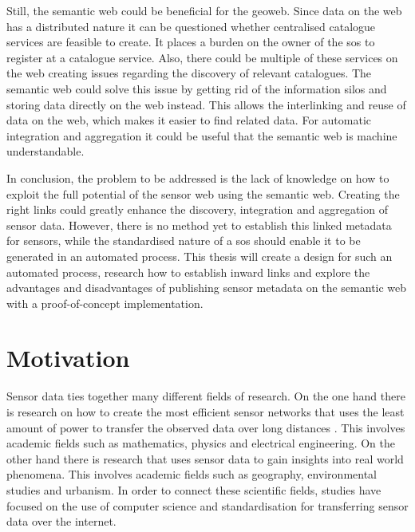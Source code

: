 Still, the semantic web could be beneficial for the geoweb. Since data on the web has a distributed nature it can be questioned whether centralised catalogue services are feasible to create. It places a burden on the owner of the \ac{sos} to register at a catalogue service. Also, there could be multiple of these services on the web creating issues regarding the discovery of relevant catalogues. The semantic web could solve this issue by getting rid of the information silos and storing data directly on the web instead. This allows the interlinking and reuse of data on the web, which makes it easier to find related data. For automatic integration and aggregation it could be useful that the semantic web is machine understandable. 

In conclusion, the problem to be addressed is the lack of knowledge on how to exploit the full potential of the sensor web using the semantic web. Creating the right links could greatly enhance the discovery, integration and aggregation of sensor data. However, there is no method yet to establish this linked metadata for sensors, while the standardised nature of a \ac{sos} should enable it to be generated in an automated process. This thesis will create a design for such an automated process, research how to establish inward links and explore the advantages and disadvantages of publishing sensor metadata on the semantic web with a proof-of-concept implementation. 

\section{Motivation}
Sensor data ties together many different fields of research. On the one hand there is research on how to create the most efficient sensor networks that uses the least amount of power to transfer the observed data over long distances \citep{SW:Korteweg,SW:Xiang}. This involves academic fields such as mathematics, physics and electrical engineering. On the other hand there is research that uses sensor data to gain insights into real world phenomena. This involves academic fields such as geography, environmental studies and urbanism. In order to connect these scientific fields, studies have focused on the use of computer science and standardisation for transferring sensor data over the internet. 

